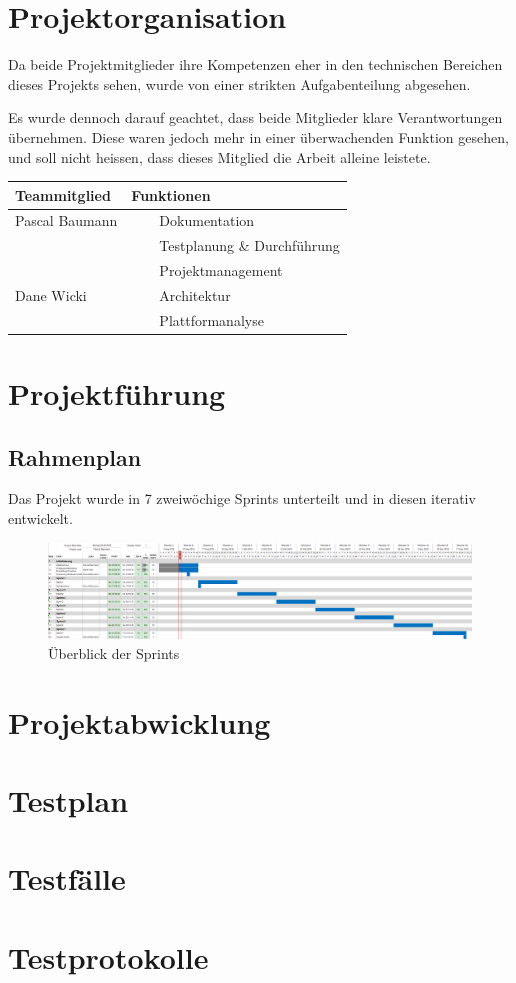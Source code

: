 \documentclass[a4paper]{scrreprt}
\newcommand{\tabitem}{~~\llap{\textbullet}~~}
\begin{document}
\section{Projektorganisation}
Da beide Projektmitglieder ihre Kompetenzen eher in den technischen Bereichen dieses Projekts sehen, wurde von einer strikten Aufgabenteilung abgesehen.

Es wurde dennoch darauf geachtet, dass beide Mitglieder klare Verantwortungen übernehmen. Diese waren jedoch mehr in einer überwachenden Funktion gesehen, und soll nicht heissen, dass dieses Mitglied die Arbeit alleine leistete.

\vspace{1em}

\begin{tabularx}{\textwidth}{|X|X|}
	\hline
	\textbf{Teammitglied} & \textbf{Funktionen} \\
	\hline
	Pascal Baumann & \tabitem Dokumentation \\
	& \tabitem Testplanung \& Durchführung \\
	& \tabitem Projektmanagement \\
	\hline
	Dane Wicki & \tabitem Architektur \\
	& \tabitem Plattformanalyse \\
	\hline
\end{tabularx}

\section{Projektführung}

\subsection{Rahmenplan}

Das Projekt wurde in 7 zweiwöchige Sprints unterteilt und in diesen iterativ entwickelt.

\vspace{1em}

\begin{figure}
	\includegraphics[keepaspectratio, width=\textwidth]{Rahmenplan}
	\caption{Überblick der Sprints}
\end{figure}

\section{Projektabwicklung}

\section{Testplan}

\section{Testfälle}

\section{Testprotokolle}


\appendix
\end{document}
